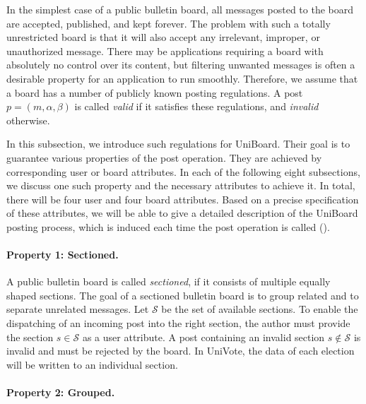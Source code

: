 \documentclass[bibtotoc,halfparskip,oneside]{scrreprt}
\begin{document}
In the simplest case of a public bulletin board, all messages posted to the board are accepted, published, and kept forever. The problem with such a totally unrestricted board is that it will also accept any irrelevant, improper, or unauthorized message. There may be applications requiring a  board with absolutely no control over its content, but filtering unwanted messages is often a desirable property for an application to run smoothly. Therefore, we assume that a board has a number of publicly known posting regulations. A post $p=(m,\alpha,\beta)$ is called \emph{valid} if it satisfies these regulations, and \emph{invalid} otherwise.

In this subsection, we introduce such regulations for UniBoard. Their goal is to guarantee various properties of the post operation. They are achieved by corresponding user or board attributes. In each of the following eight subsections, we discuss one such property and the necessary attributes to achieve it. In total, there will be four user and four board attributes. Based on a precise specification of these attributes, we will be able to give a detailed description of the UniBoard posting process, which is induced each time the post operation is called ().

\paragraph*{Property 1: Sectioned.}

A public bulletin board is called \emph{sectioned}, if it consists of multiple equally shaped sections. The goal of a sectioned bulletin board is to group related and to separate unrelated messages. Let $\mathcal{S}$ be the set of available sections. To enable the dispatching of an incoming post into the right section, the author must provide the section $s\in\mathcal{S}$ as a user attribute. A post containing an invalid section $s\not\in\mathcal{S}$ is invalid and must be rejected by the board. In UniVote, the data of each election will be written to an individual section.

\paragraph*{Property 2: Grouped.}
\end{document}
